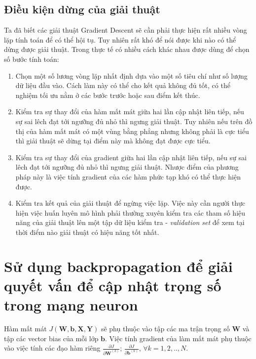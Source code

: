 \subsection{Điều kiện dừng của giải thuật}
Ta đã biết các giải thuật Gradient Descent sẽ cần phải thực hiện rất nhiều vòng lặp tính toán để có thể hội tụ. Tuy nhiên rất khó để nói được khi nào có thể dừng được giải thuật. Trong thực tế có nhiều cách khác nhau được dùng để chọn số bước tính toán:
\begin{enumerate}
	\item Chọn một số lương vòng lặp nhất định dựa vào một số tiêu chí như số lượng dữ liệu đầu vào. Cách làm này có thể cho kết quả không đủ tốt, có thể nghiệm tối ưu nằm ở các bước trước hoặc sau điểm kết thúc.
	\item Kiểm tra sự thay đổi của hàm mất mát giữa hai lần cập nhật liên tiếp, nếu sự sai lêch đạt tới ngưỡng đủ nhỏ thì ngưng giải thuật. Tuy nhiên nếu trên đồ thị của hàm mất mát có một vùng bằng phẳng nhưng không phải là cực tiểu thì giải thuật sẽ dừng tại điểm này mà không đạt được cực tiểu.
	\item Kiểm tra sự thay đổi của gradient giữa hai lần cập nhật liên tiếp, nếu sự sai lêch đạt tới ngưỡng đủ nhỏ thì ngưng giải thuật. Nhược điểm của phương pháp này là việc tính gradient của các hàm phức tạp khó có thể thực hiện được.
	\item Kiểm tra kết quả của giải thuật để ngừng việc lặp. Việc này cần người thực hiện việc huấn luyên mô hình phải thường xuyên kiểm tra các tham số hiệu năng của giải thuật lên một tập dữ liệu kiểm tra - \emph{validation set} để xem tại thời điểm nào giải thuật có hiệu năng tốt nhất.
\end{enumerate}
\section{Sử dụng backpropagation để giải quyết vấn để cập nhật trọng số trong mạng neuron}
Hàm mất mát $J\left({\boldsymbol{W}},{\boldsymbol{b}},{\boldsymbol{X}},{\boldsymbol{Y}}\right)$ sẽ phụ thuộc vào tập các ma trận trọng số $\boldsymbol{W}$ và tập các vector bias của mỗi lớp $\boldsymbol{b}$. Việc tính gradient của làm mất mát phụ thuộc vào việc tính các đạo hàm riêng ${\frac{{\partial}J}{{{\partial}\boldsymbol{W}}^{(k)}}}$; ${\frac{{\partial}J}{{\partial}\boldsymbol{b}^{(k)}}}$, ${\forall}k=1,2,..,N$.

